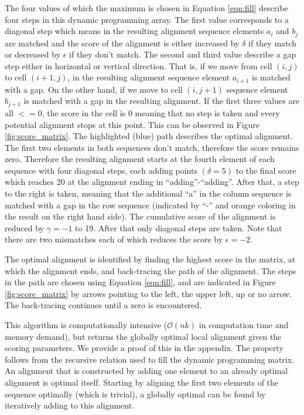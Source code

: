 \documentclass[12pt]{article} %
\begin{document}
The four values of which the maximum is chosen in Equation \ref{eqn:fill}
describe four steps in this dynamic programming array. The first value
corresponds to a diagonal step which means in the resulting alignment sequence
elements $a_i$ and $b_j$ are matched and the score of the alignment is either
increased by $\delta$ if they match or decreased by $\epsilon$ if they don't
match. The second and third value describe a gap step either in horizontal or
vertical direction. That is, if we move from cell $(i,j)$ to cell $(i+1,j)$, in
the resulting alignment sequence element $a_{i+1}$ is matched with a gap. On the
other hand, if we move to cell $(i, j+1)$ sequence element $b_{j+1}$ is matched
with a gap in the resulting alignment. If the first three values are all $<= 0$,
the score in the cell is 0 meaning that no step is taken and every potential
alignment stops at this point. This can be observed in Figure
\ref{fig:score_matrix}. The highlighted (blue) path describes the optimal alignment. The first two elements in both sequences don't match, therefore the score remains zero. Therefore the resulting alignment starts at the fourth element of each sequence with four diagonal steps, each adding points $(\delta = 5)$ to the final score which reaches 20 at the alignment ending in ``adding''-``adding''. After that, a step to the right is taken, meaning that the additional ``a'' in the column sequence is matched with a gap in the row sequence (indicated by ``-'' and orange coloring in the result on the right hand side). The cumulative score of the alignment is reduced by $\gamma = -1$ to 19. After that only diagonal steps are taken. Note that there are two mismatches each of which reduces the score by $\epsilon = -2$. 

The optimal alignment is identified by finding the highest score in the matrix,
at which the alignment ends, and back-tracing the path of the alignment. The
steps in the path are chosen using Equation \ref{eqn:fill}, and are indicated in
Figure \ref{fig:score_matrix} by arrows pointing to the left, the upper left, up
or no arrow. The back-tracing continues until a  zero is encountered.

This algorithm is computationally intensive ($\mathcal{O}(nk)$ in computation
time and memory demand), but returns the globally optimal local alignment given the scoring parameters. We provide a proof of this in the appendix. The property follows from the recursive relation used to fill the dynamic programming matrix. An alignment that is constructed by adding one element to an already optimal alignment is optimal itself. Starting by aligning the first two elements of the sequence optimally (which is trivial), a globally optimal can be found by iteratively adding to this alignment.
\end{document}
